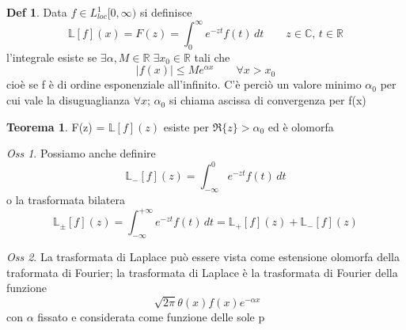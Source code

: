 \documentclass[a4paper,11pt]{report}
\theoremstyle{remark}
\newtheorem*{oss}{Oss}
\theoremstyle{definition}
\newtheorem*{teo}{Teorema}
\newtheorem*{Def}{Def}
\newcommand{\C}{\mathbb{C}}
\newcommand{\R}{\mathbb{R}}
\begin{document}
\begin{Def}
	Data $f \in L^1_{loc} [0,\infty)$ si definisce
	\begin{equation*}
		\mathbb{L}[f](x) = F(z) = \int^\infty_0 e^{-zt}f(t) \, dt \qquad z \in \C,\, t \in \R
	\end{equation*}
	l'integrale esiste se $\exists \alpha, M \in \R \; \exists x_0 \in \R$ tali che 
	\begin{equation*}
		|f(x)| \leq Me^{\alpha x} \qquad \forall x> x_0
	\end{equation*}
	cioè se f è di ordine esponenziale all'infinito. C'è perciò un valore minimo $\alpha_0$ per cui vale la disuguaglianza $\forall x $; $\alpha_0$ si chiama ascissa di convergenza per f(x)
\end{Def}
\begin{teo}
	F(z) = $\mathbb{L}[f](z)$ esiste per $\Re\{z\}> \alpha_0$ ed è olomorfa
\end{teo}
\begin{oss}
	Possiamo anche definire
	\begin{equation*}
		\mathbb{L}_- [f](z) = \int^0_{-\infty} e^{-zt}f(t) \, dt
	\end{equation*}
	o la trasformata bilatera
	\begin{equation*}
		\mathbb{L}_{\pm} [f](z) = \int^{+\infty}_{-\infty} e^{-zt}f(t) \, dt = \mathbb{L}_+ [f](z) + \mathbb{L}_- [f] (z)
	\end{equation*}
\end{oss}
\begin{oss}
	La trasformata di Laplace può essere vista come estensione olomorfa della traformata di Fourier; la trasformata di Laplace è la trasformata di Fourier della funzione 
	\begin{equation*}
		\sqrt[]{2\pi} \theta(x) f(x) e^{-\alpha x }
	\end{equation*}
	con $\alpha$ fissato e considerata come funzione delle sole p
\end{oss}
\end{document}
